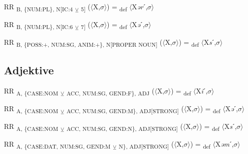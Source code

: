{\begin{exe}
 RR \textsubscript{B, \{NUM:PL\}, N[IC:4} \textsubscript{${\veebar}$}\textsubscript{ 5]} ($\langle$X,$\sigma $$\rangle$) = \textsubscript{def} $\langle$X\textit{ər}ˊ,$\sigma $$\rangle$
\end{exe}

\begin{exe}
 RR \textsubscript{B, \{NUM:PL\}, N[IC:6} \textsubscript{${\veebar}$}\textsubscript{ 7]} ($\langle$X,$\sigma $$\rangle$) = \textsubscript{def} $\langle$X\textit{ə}ˊ,$\sigma $$\rangle$
\end{exe}

\begin{exe}
 RR \textsubscript{B, \{POSS:+, NUM:SG, ANIM:+\}, N[}\textsubscript{PROPER NOUN]} ($\langle$X,$\sigma $$\rangle$) = \textsubscript{def} $\langle$X\textit{s}ˊ,$\sigma $$\rangle$
\end{exe}

\subsection{Adjektive}

\begin{exe}
 RR \textsubscript{A, \{CASE:NOM} \textsubscript{${\veebar}$}\textsubscript{ ACC, NUM:SG, GEND:F\}, ADJ} ($\langle$X,$\sigma $$\rangle$) = \textsubscript{def} $\langle$X\textit{i}ˊ,$\sigma $$\rangle$
\end{exe}

\begin{exe}
 RR \textsubscript{A, \{CASE:NOM} \textsubscript{${\veebar}$}\textsubscript{ ACC, NUM:SG, GEND:M\}, ADJ[STRONG]} ($\langle$X,$\sigma $$\rangle$) = \textsubscript{def} $\langle$X\textit{ə}ˊ,$\sigma $$\rangle$
\end{exe}

\begin{exe}
 RR \textsubscript{A, \{CASE:NOM} \textsubscript{${\veebar}$}\textsubscript{ ACC, NUM:SG, GEND:N\}, ADJ[STRONG]} ($\langle$X,$\sigma $$\rangle$) = \textsubscript{def} $\langle$X\textit{s}ˊ,$\sigma $$\rangle$
\end{exe}

\begin{exe}
 RR \textsubscript{A, \{CASE:DAT, NUM:SG, GEND:M} \textsubscript{${\veebar}$}\textsubscript{ N\}, ADJ[STRONG]} ($\langle$X,$\sigma $$\rangle$) = \textsubscript{def} $\langle$X\textit{əm}ˊ,$\sigma $$\rangle$
\end{exe}

}
